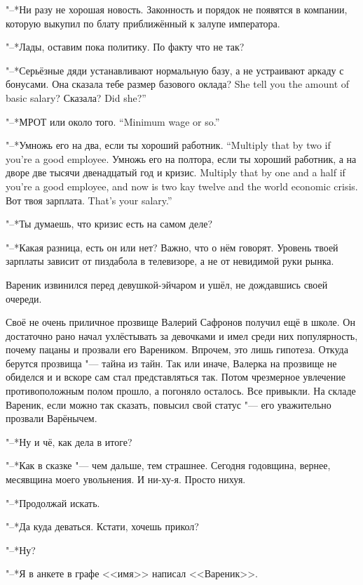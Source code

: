 "--*Ни разу не хорошая новость.
Законность и порядок не появятся в компании, которую выкупил по блату приближённый к залупе императора.

"--*Лады, оставим пока политику.
По факту что не так?

"--*Серьёзные дяди устанавливают нормальную базу, а не устраивают аркаду с бонусами.
{Она сказала тебе размер базового оклада?}
{She tell you the amount of basic salary?}
{Сказала?}
{Did she?''}

{"--*МРОТ или около того.}
{``Minimum wage or so.''}

{"--*Умножь его на два, если ты хороший работник.}
{``Multiply that by two if you're a good employee.}
{Умножь его на полтора, если ты хороший работник, а на дворе две тысячи двенадцатый год и кризис.}
{Multiply that by one and a half if you're a good employee, and now is two kay twelve and the world economic crisis.}
{Вот твоя зарплата.}
{That's your salary.''}

"--*Ты думаешь, что кризис есть на самом деле?

"--*Какая разница, есть он или нет?
Важно, что о нём говорят.
Уровень твоей зарплаты зависит от пиздабола в телевизоре, а не от невидимой руки рынка.

Вареник извинился перед девушкой-эйчаром и ушёл, не дождавшись своей очереди.

\asterism

Своё не очень приличное прозвище Валерий Сафронов получил ещё в школе.
Он достаточно рано начал ухлёстывать за девочками и имел среди них популярность, почему пацаны и прозвали его Вареником.
Впрочем, это лишь гипотеза.
Откуда берутся прозвища "--- тайна из тайн.
Так или иначе, Валерка на прозвище не обиделся и и вскоре сам стал представляться так.
Потом чрезмерное увлечение противоположным полом прошло, а погоняло осталось.
Все привыкли.
На складе Вареник, если можно так сказать, повысил свой статус "--- его уважительно прозвали Варёнычем.

\textspace

"--*Ну и чё, как дела в итоге?

"--*Как в сказке "--- чем дальше, тем страшнее.
Сегодня годовщина, вернее, месявщина моего увольнения.
И ни-ху-я.
Просто нихуя.

"--*Продолжай искать.

"--*Да куда деваться.
Кстати, хочешь прикол?

"--*Ну?

"--*Я в анкете в графе <<имя>> написал <<Вареник>>.

